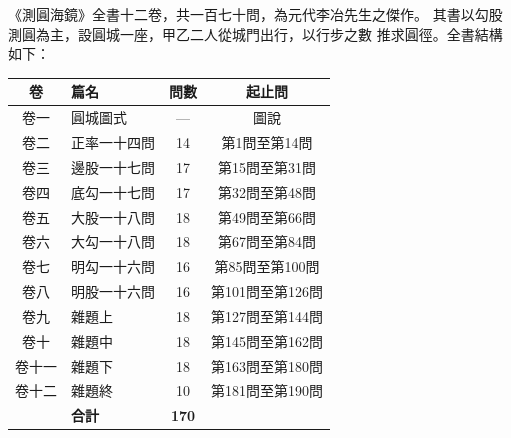 \documentclass[11pt,a4paper]{article}
\begin{document}
\noindent
\begin{minipage}[t]{0.48\textwidth}
《測圓海鏡》全書十二卷，共一百七十問，為元代李冶先生之傑作。
其書以勾股測圓為主，設圓城一座，甲乙二人從城門出行，以行步之數
推求圓徑。全書結構如下：

\vspace{0.3cm}
\begin{center}
\begin{tabular}{clcc}
\toprule
\textbf{卷} & \textbf{篇名} & \textbf{問數} & \textbf{起止問} \\
\midrule
卷一 & 圓城圖式 & --- & 圖說 \\
卷二 & 正率一十四問 & 14 & 第1問至第14問 \\
卷三 & 邊股一十七問 & 17 & 第15問至第31問 \\
\rowcolor{gray!15}
卷四 & 底勾一十七問 & 17 & 第32問至第48問 \\
\rowcolor{gray!15}
卷五 & 大股一十八問 & 18 & 第49問至第66問 \\
\rowcolor{gray!15}
卷六 & 大勾一十八問 & 18 & 第67問至第84問 \\
卷七 & 明勾一十六問 & 16 & 第85問至第100問 \\
卷八 & 明股一十六問 & 16 & 第101問至第126問 \\
卷九 & 雜題上 & 18 & 第127問至第144問 \\
卷十 & 雜題中 & 18 & 第145問至第162問 \\
卷十一 & 雜題下 & 18 & 第163問至第180問 \\
卷十二 & 雜題終 & 10 & 第181問至第190問 \\
\midrule
 & \textbf{合計} & \textbf{170} & \\
\bottomrule
\end{tabular}
\end{center}
\end{minipage}
\hfill
\end{document}
